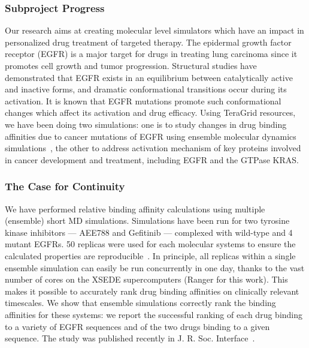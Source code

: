 \documentclass[a4paper,10pt]{article}
\begin{document}
\subsubsection{Subproject Progress}
Our research aims at creating molecular level simulators which have an impact in personalized drug treatment of targeted therapy. The epidermal growth factor receptor (EGFR) is a major target for drugs in treating lung carcinoma since it promotes cell growth and tumor progression. Structural studies have demonstrated that EGFR exists in an equilibrium between catalytically active and inactive forms, and dramatic conformational transitions occur during its activation. It is known that EGFR mutations promote such conformational changes which affect its activation and drug efficacy. Using TeraGrid resources, we have been doing two simulations: one is to study changes in drug binding affinities due to cancer mutations of EGFR using ensemble molecular dynamics simulations~\cite{Ref6,Ref7,Ref8}, the other to address activation mechanism of key proteins involved in cancer development and treatment, including EGFR and the GTPase KRAS.

\subsubsection{The Case for Continuity}
We have performed relative binding affinity calculations using multiple (ensemble) short MD 
simulations. Simulations have been run for two tyrosine kinase inhibitors — AEE788 and Gefitinib — 
complexed with wild-type and 4 mutant EGFRs. 50 replicas were used for each molecular systems to 
ensure the calculated properties are reproducible~\cite{Ref6}. In principle, all replicas within a single 
ensemble simulation can easily be run concurrently in one day, thanks to the vast number of cores 
on the XSEDE supercomputers (Ranger for this work). This makes it possible to accurately rank 
drug binding affinities on clinically relevant timescales. We show that ensemble simulations 
correctly rank the binding affinities for these systems: we report the successful ranking of each 
drug binding to a variety of EGFR sequences and of the two drugs binding to a given sequence. The 
study was published recently in J. R. Soc. Interface~\cite{Ref6}.
\end{document}
